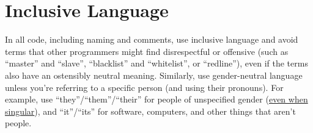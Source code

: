 
\chapter{Inclusive Language}\label{ch:inclusive-language}

In all code, including naming and comments, use inclusive language and avoid terms that other programmers might find disrespectful or offensive (such as \enquote{master} and \enquote{slave}, \enquote{blacklist} and \enquote{whitelist}, or \enquote{redline}), even if the terms also have an ostensibly neutral meaning. Similarly, use gender-neutral language unless you're referring to a specific person (and using their pronouns). For example, use \enquote{they}/\enquote{them}/\enquote{their} for people of unspecified gender (\hyperref[ch:singular-they]{even when singular}), and \enquote{it}/\enquote{its} for software, computers, and other things that aren't people.
